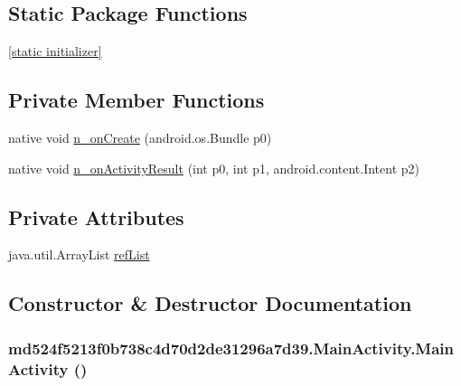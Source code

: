 \subsection*{Static Package Functions}
\begin{CompactItemize}
\item 
\hyperlink{classmd524f5213f0b738c4d70d2de31296a7d39_1_1_main_activity_1d35ea6707bf279c2c796c89d68b13ae}{\mbox{[}static initializer\mbox{]}}
\end{CompactItemize}
\subsection*{Private Member Functions}
\begin{CompactItemize}
\item 
native void \hyperlink{classmd524f5213f0b738c4d70d2de31296a7d39_1_1_main_activity_9dfe7db08412a7c918b87ddeac611a44}{n\_\-onCreate} (android.os.Bundle p0)
\item 
native void \hyperlink{classmd524f5213f0b738c4d70d2de31296a7d39_1_1_main_activity_e6a325dab3576afac11530dd570d4f4c}{n\_\-onActivityResult} (int p0, int p1, android.content.Intent p2)
\end{CompactItemize}
\subsection*{Private Attributes}
\begin{CompactItemize}
\item 
java.util.ArrayList \hyperlink{classmd524f5213f0b738c4d70d2de31296a7d39_1_1_main_activity_bb20fe5f20e2a815a5bc013b63706a44}{refList}
\end{CompactItemize}


\subsection{Constructor \& Destructor Documentation}
\hypertarget{classmd524f5213f0b738c4d70d2de31296a7d39_1_1_main_activity_d67212f116f053a8ffe461e523a96d1b}{
\subsubsection[{MainActivity}]{\setlength{\rightskip}{0pt plus 5cm}md524f5213f0b738c4d70d2de31296a7d39.MainActivity.MainActivity ()}}
\label{classmd524f5213f0b738c4d70d2de31296a7d39_1_1_main_activity_d67212f116f053a8ffe461e523a96d1b}




